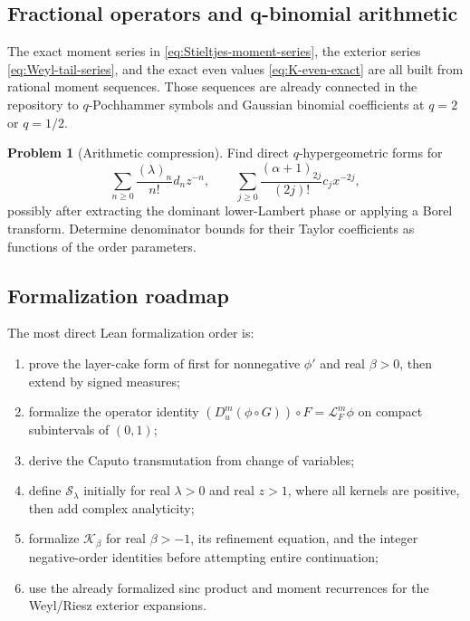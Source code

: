 \documentclass[11pt,oneside]{article}
\theoremstyle{definition}
\newtheorem{problem}[theorem]{Problem}
\theoremstyle{remark}
\newcommand{\poch}[2]{\left(#1\right)_{#2}}
\newcommand{\LapF}{\mathcal L_F}
\newcommand{\Kord}{\mathcal K}
\newcommand{\Sord}{\mathcal S}
\begin{document}
\subsection{Fractional operators and q-binomial arithmetic}

The exact moment series in \eqref{eq:Stieltjes-moment-series}, the exterior
series \eqref{eq:Weyl-tail-series}, and the exact even values
\eqref{eq:K-even-exact} are all built from rational moment sequences.  Those
sequences are already connected in the repository to $q$-Pochhammer symbols
and Gaussian binomial coefficients at $q=2$ or $q=1/2$.

\begin{problem}[Arithmetic compression]
Find direct $q$-hypergeometric forms for
\begin{equation}
 \sum_{n\ge0}\frac{\poch{\lambda}{n}}{n!}d_nz^{-n},
 \qquad
 \sum_{j\ge0}\frac{\poch{\alpha+1}{2j}}{(2j)!}c_jx^{-2j},
\end{equation}
possibly after extracting the dominant lower-Lambert phase or applying a
Borel transform.  Determine denominator bounds for their Taylor
coefficients as functions of the order parameters.
\end{problem}

\subsection{Formalization roadmap}

The most direct Lean formalization order is:

\begin{enumerate}
\item prove the layer-cake form of  first for
      nonnegative $\phi'$ and real $\beta>0$, then extend by signed measures;
\item formalize the operator identity
      $(D_u^m(\phi\circ G))\circ F=\LapF^m\phi$ on compact subintervals of
      $(0,1)$;
\item derive the Caputo transmutation from change of variables;
\item define $\Sord_\lambda$ initially for real $\lambda>0$ and real $z>1$,
      where all kernels are positive, then add complex analyticity;
\item formalize $\Kord_\beta$ for real $\beta>-1$, its refinement equation,
      and the integer negative-order identities before attempting entire
      continuation;
\item use the already formalized sinc product and moment recurrences for the
      Weyl/Riesz exterior expansions.
\end{enumerate}
\end{document}
